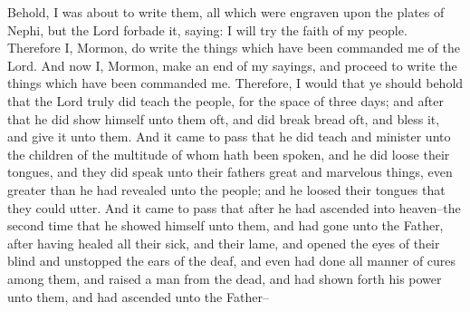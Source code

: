 Behold, I was about to write them, all which were engraven upon the plates of Nephi, but the Lord forbade it, saying: I will try the faith of my people.
\bverse \iffalse Therefore I, Mormon, do write the things which have been commanded me of the Lord. And now I, Mormon, make an end of my sayings, and proceed to write the things which have been commanded me. \fi
Therefore I, Mormon, do write the things which have been commanded me of the Lord. And now I, Mormon, make an end of my sayings, and proceed to write the things which have been commanded me.
\bverse \iffalse Therefore, I would that ye should behold that the Lord truly did teach the people, for the space of three days; and after that he did show himself unto them oft, and did break bread oft, and bless it, and give it unto them. \fi
Therefore, I would that ye should behold that the Lord truly did teach the people, for the space of three days; and after that he did show himself unto them oft, and did break bread oft, and bless it, and give it unto them.
\bverse \iffalse And it came to pass that he did teach and minister unto the children of the multitude of whom hath been spoken, and he did loose their tongues, and they did speak unto their fathers great and marvelous things, even greater than he had revealed unto the people; and he loosed their tongues that they could utter. \fi
And it came to pass that he did teach and minister unto the children of the multitude of whom hath been spoken, and he did loose their tongues, and they did speak unto their fathers great and marvelous things, even greater than he had revealed unto the people; and he loosed their tongues that they could utter.
\bverse \iffalse And it came to pass that after he had ascended into heaven--the second time that he showed himself unto them, and had gone unto the Father, after having healed all their sick, and their lame, and opened the eyes of their blind and unstopped the ears of the deaf, and even had done all manner of cures among them, and raised a man from the dead, and had shown forth his power unto them, and had ascended unto the Father-- \fi
And it came to pass that after he had ascended into heaven--the second time that he showed himself unto them, and had gone unto the Father, after having healed all their sick, and their lame, and opened the eyes of their blind and unstopped the ears of the deaf, and even had done all manner of cures among them, and raised a man from the dead, and had shown forth his power unto them, and had ascended unto the Father--

